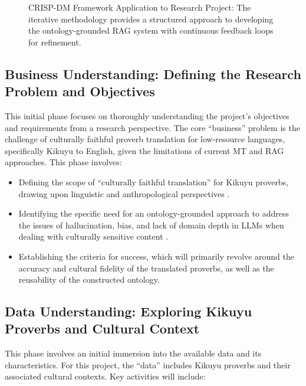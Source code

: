 \documentclass[12pt]{article}
\let\cite\textcite  %
\begin{document}
\begin{figure}[htbp]
\begin{tikzpicture}[node distance=2cm, auto]
\end{tikzpicture}
\caption{CRISP-DM Framework Application to Research Project: The iterative methodology provides a structured approach to developing the ontology-grounded RAG system with continuous feedback loops for refinement.}
\label{fig:crisp-dm-framework}
\end{figure}

\subsection{Business Understanding: Defining the Research Problem and Objectives}

This initial phase focuses on thoroughly understanding the project's objectives and requirements from a research perspective. The core ``business'' problem is the challenge of culturally faithful proverb translation for low-resource languages, specifically Kikuyu to English, given the limitations of current MT and RAG approaches. This phase involves:

\begin{itemize}
\item Defining the scope of ``culturally faithful translation'' for Kikuyu proverbs, drawing upon linguistic and anthropological perspectives \cite{smith2023cultural}.
\item Identifying the specific need for an ontology-grounded approach to address the issues of hallucination, bias, and lack of domain depth in LLMs when dealing with culturally sensitive content \cite{openai2023llm}.
\item Establishing the criteria for success, which will primarily revolve around the accuracy and cultural fidelity of the translated proverbs, as well as the reusability of the constructed ontology.
\end{itemize}

\subsection{Data Understanding: Exploring Kikuyu Proverbs and Cultural Context}

This phase involves an initial immersion into the available data and its characteristics. For this project, the ``data'' includes Kikuyu proverbs and their associated cultural contexts. Key activities will include:
\end{document}

